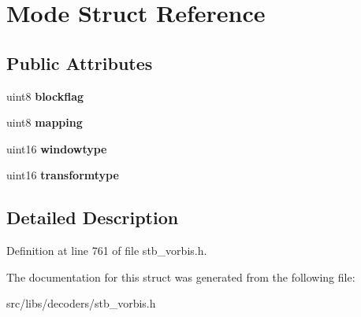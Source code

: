 \hypertarget{structMode}{\section{Mode Struct Reference}
\label{structMode}
}
\subsection*{Public Attributes}
\begin{DoxyCompactItemize}
\item 
\hypertarget{structMode_abc3023110a01eb21ac915398246c5868}{uint8 {\bfseries blockflag}}\label{structMode_abc3023110a01eb21ac915398246c5868}

\item 
\hypertarget{structMode_a56d2ce10834c4f563f402359db99af9f}{uint8 {\bfseries mapping}}\label{structMode_a56d2ce10834c4f563f402359db99af9f}

\item 
\hypertarget{structMode_a000084125ae3760f66182ab4adae705e}{uint16 {\bfseries windowtype}}\label{structMode_a000084125ae3760f66182ab4adae705e}

\item 
\hypertarget{structMode_a2f78100869ebed55b17f89e6a0202aac}{uint16 {\bfseries transformtype}}\label{structMode_a2f78100869ebed55b17f89e6a0202aac}

\end{DoxyCompactItemize}


\subsection{Detailed Description}


Definition at line 761 of file stb\-\_\-vorbis.\-h.



The documentation for this struct was generated from the following file\-:\begin{DoxyCompactItemize}
\item 
src/libs/decoders/stb\-\_\-vorbis.\-h\end{DoxyCompactItemize}
